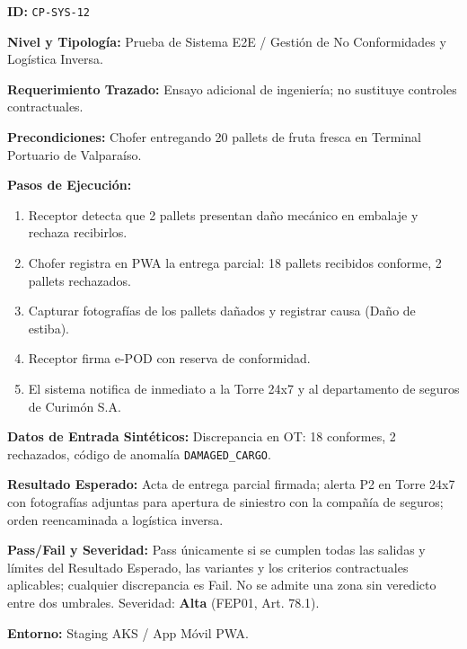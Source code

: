 \par\noindent\textbf{ID:} \texttt{C\allowbreak{}P\allowbreak{}-\allowbreak{}S\allowbreak{}Y\allowbreak{}S\allowbreak{}-\allowbreak{}1\allowbreak{}2\allowbreak{}}\par
\par\noindent\textbf{Nivel y Tipología:} Prueba de Sistema E2E / Gestión de No Conformidades y Logística Inversa.\par
\par\noindent\textbf{Requerimiento Trazado:} Ensayo adicional de ingeniería; no sustituye controles contractuales.\par
\par\noindent\textbf{Precondiciones:} Chofer entregando 20 pallets de fruta fresca en Terminal Portuario de Valparaíso.\par
\par\noindent\textbf{Pasos de Ejecución:} \par
\begin{enumerate}
\item Receptor detecta que 2 pallets presentan daño mecánico en embalaje y rechaza recibirlos.
\item Chofer registra en PWA la entrega parcial: 18 pallets recibidos conforme, 2 pallets rechazados.
\item Capturar fotografías de los pallets dañados y registrar causa (Daño de estiba).
\item Receptor firma e-POD con reserva de conformidad.
\item El sistema notifica de inmediato a la Torre 24x7 y al departamento de seguros de Curimón S.A.
\end{enumerate}
\par\noindent\textbf{Datos de Entrada Sintéticos:} Discrepancia en OT: 18 conformes, 2 rechazados, código de anomalía \texttt{D\allowbreak{}A\allowbreak{}M\allowbreak{}A\allowbreak{}G\allowbreak{}E\allowbreak{}D\allowbreak{}\_\allowbreak{}C\allowbreak{}A\allowbreak{}R\allowbreak{}G\allowbreak{}O\allowbreak{}}.\par
\par\noindent\textbf{Resultado Esperado:} Acta de entrega parcial firmada; alerta P2 en Torre 24x7 con fotografías adjuntas para apertura de siniestro con la compañía de seguros; orden reencaminada a logística inversa.\par
\par\noindent\textbf{Pass/Fail y Severidad:} Pass únicamente si se cumplen todas las salidas y límites del Resultado Esperado, las variantes y los criterios contractuales aplicables; cualquier discrepancia es Fail. No se admite una zona sin veredicto entre dos umbrales. Severidad: \textbf{Alta} (FEP01, Art. 78.1).\par
\par\noindent\textbf{Entorno:} Staging AKS / App Móvil PWA.\par






